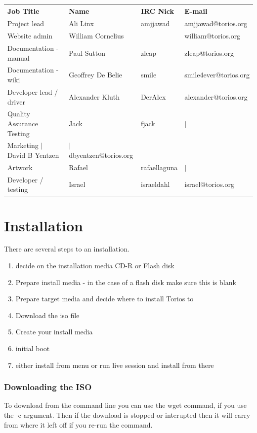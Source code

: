 \documentclass[12pt,a4paper]{book}
\begin{document}
\begin{center}\begin{tabular}{|l|l|l|l|}
\hline \textbf{Job Title} & \textbf{Name} & \textbf{IRC Nick} & \textbf{E-mail} \\
\hline Project lead & Ali Linx & amjjawad & amjjawad@torios.org \\
\hline Website admin & William Cornelius &  & william@torios.org \\
\hline Documentation - manual & Paul Sutton & zleap	& zleap@torios.org \\
\hline Documentation - wiki & Geoffrey De Belie & smile & smile4ever@torios.org \\
\hline Developer lead / driver & Alexander Kluth & DerAlex & alexander@torios.org \\
\hline Quality Assurance Testing & Jack & fjack & $|$ \\
\hline Marketing $|$	David B Yentzen & $|$ dbyentzen@torios.org \\
\hline Artwork & Rafael & rafaellaguna & $|$ \\
\hline Developer / testing & Israel & israeldahl & israel@torios.org \\
\hline \end{tabular}\end{center}


\chapter{Installation}

There are several steps to an installation. \\
\begin{enumerate}
\item decide on the installation media CD-R or Flash disk
\item Prepare install media - in the case of a flash disk make sure this is blank
\item Prepare target media and decide where to install Torios to
\item Download the iso file
\item Create your install media
\item initial boot
\item either install from menu or run live session and install from there
\end{enumerate}

\subsection{Downloading the ISO}
To download from the command line you can use the wget command, if you use the -c argument.  Then if the download is stopped or interupted then it will carry from where it left off if you re-run the command.\\
\end{document}
